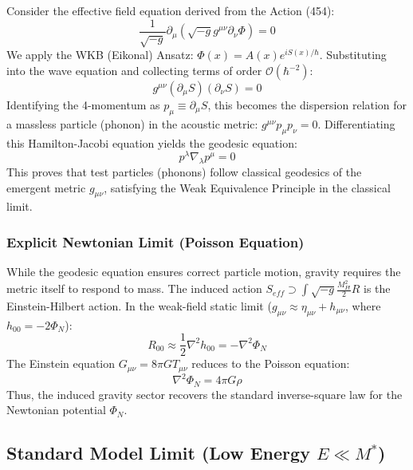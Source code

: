 \documentclass[a4paper,12pt]{article}
\begin{document}
Consider the effective field equation derived from the Action (454):
\begin{equation}
    \frac{1}{\sqrt{-g}} \partial_\mu (\sqrt{-g} g^{\mu\nu} \partial_\nu \Phi) = 0
\end{equation}
We apply the WKB (Eikonal) Ansatz: $\Phi(x) = A(x) e^{i S(x)/\hbar}$. Substituting into the wave equation and collecting terms of order $\mathcal{O}(\hbar^{-2})$:
\begin{equation}
    g^{\mu\nu} (\partial_\mu S) (\partial_\nu S) = 0
\end{equation}
Identifying the 4-momentum as $p_\mu \equiv \partial_\mu S$, this becomes the dispersion relation for a massless particle (phonon) in the acoustic metric: $g^{\mu\nu} p_\mu p_\nu = 0$. Differentiating this Hamilton-Jacobi equation yields the geodesic equation:
\begin{equation}
    p^\lambda \nabla_\lambda p^\mu = 0
\end{equation}
This proves that test particles (phonons) follow classical geodesics of the emergent metric $g_{\mu\nu}$, satisfying the Weak Equivalence Principle in the classical limit.

\subsubsection{Explicit Newtonian Limit (Poisson Equation)}
While the geodesic equation ensures correct particle motion, gravity requires the metric itself to respond to mass.
The induced action $S_{eff} \supset \int \sqrt{-g} \frac{M_{Pl}^2}{2} R$ is the Einstein-Hilbert action.
In the weak-field static limit ($g_{\mu\nu} \approx \eta_{\mu\nu} + h_{\mu\nu}$, where $h_{00} = -2\Phi_N$):
\begin{equation}
    R_{00} \approx \frac{1}{2} \nabla^2 h_{00} = -\nabla^2 \Phi_N
\end{equation}
The Einstein equation $G_{\mu\nu} = 8\pi G T_{\mu\nu}$ reduces to the Poisson equation:
\begin{equation}
    \nabla^2 \Phi_N = 4\pi G \rho
\end{equation}
Thus, the induced gravity sector recovers the standard inverse-square law for the Newtonian potential $\Phi_N$.

\subsection{Standard Model Limit (Low Energy $E \ll M^*$)}
\end{document}
